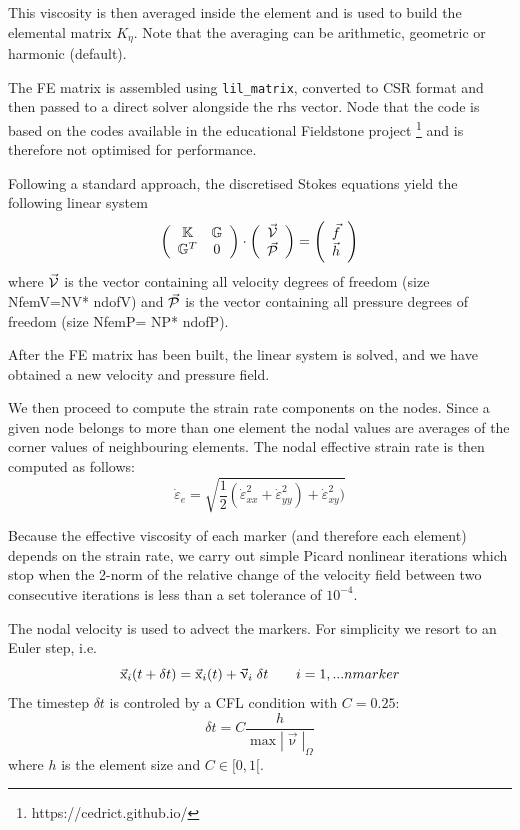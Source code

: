 \documentclass[a4paper]{article}
\newcommand{\K}{{\mathbb{K}}}
\newcommand{\G}{{\mathbb{G}}}
\begin{document}
This viscosity is then averaged inside the element and is used to build
the elemental matrix $K_\eta$. Note that the averaging can be arithmetic,
geometric or harmonic (default).

The FE matrix is assembled using \lstinline{lil_matrix},
converted to CSR format and then passed to a direct solver alongside the rhs vector.
Node that the code is based on the codes available in the educational Fieldstone project
\footnote{https://cedrict.github.io/}
and is therefore not optimised for performance.


Following a standard approach, the discretised Stokes equations yield
the following linear system
\[
\left(
\begin{array}{cc}
\K & \G \\
\G^T & 0 
\end{array}
\right)
\cdot
\left(
\begin{array}{c}
\vec{\cal V} \\ 
\vec{\cal P}
\end{array}
\right)
=
\left(
\begin{array}{c}
\vec{f} \\ 
\vec{h}
\end{array}
\right)
\]
where $\vec{\cal V}$ is the vector containing all velocity degrees of 
freedom (size { NfemV}={NV}*{ ndofV})
and $\vec{\cal P}$ is the vector containing all pressure degrees of freedom 
(size { NfemP}={ NP}*{ ndofP}).



After the FE matrix has been built, the linear system is solved, and 
we have obtained a new velocity and pressure field.

We then proceed to compute the strain rate components on the nodes.
Since a given node belongs to more than one element the nodal values 
are averages of the corner values of neighbouring elements.
The nodal effective strain rate is then computed as follows:
\[
\dot\varepsilon_e = \sqrt{\frac12 (
\dot\varepsilon_{xx}^2+
\dot\varepsilon_{yy}^2)+
\dot\varepsilon_{xy}^2
)} 
\]

Because the effective viscosity of each marker (and therefore each element)
depends on the strain rate, we carry out simple Picard nonlinear iterations 
which stop when the 2-norm of the relative change of the velocity field between two consecutive 
iterations is less than a set tolerance of $10^{-4}$.


The nodal velocity is used to advect the markers. 
For simplicity we resort to an Euler step, i.e.
\[
\vec{\text x}_i(t+\delta t) = \vec{\text x}_i(t) + \vec\upnu_i \; \delta t
\qquad
i=1,...nmarker 
\]
The timestep $\delta t$ is controled by a CFL condition with $C=0.25$:
\[
\delta t = C \frac{h}{\max |\vec\upnu|_\Omega}
\]
where $h$ is the element size and $C\in[0,1[$.
\end{document}
